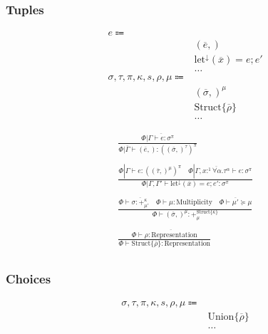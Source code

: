\documentclass {article}
\begin{document}
\subsubsection{Tuples}
\begin{align*}
e \Coloneqq & \\
& (\overline e,) \tag{Tuple Introduction} \\
& \text{let}^\downarrow (\overline x) = e; e' \tag{Tuple Elimination} \\
& \dots \\
\sigma, \tau, \pi, \kappa, s, \rho, \mu \Coloneqq & \\
& (\overline \sigma,)^\mu \tag{Tuple} \\
& \text{Struct} \{ \overline \rho \} \tag{Struct Representation} \\
& \dots
\end{align*}

\begin{gather*}
\frac
{\Phi | \overline { \Gamma \vdash e : \sigma^\pi }}
{\Phi | \overline \Gamma  \vdash (\overline e,) : ((\overline \sigma,)^\tau)^\pi } \\
\\
\frac
{\Phi | \Gamma \vdash e : ((\overline \tau,)^\mu)^\pi \quad \Phi | \Gamma , \overline {x :^1 \forall \alpha. \tau^\alpha} \vdash e : \sigma^\pi}
{\Phi | \Gamma, \Gamma' \vdash \text{let}^\downarrow (\overline x) = e; e' : \sigma^\pi} \\
\\
\frac
{\Phi \vdash \overline {\sigma : +^{\kappa}_{\mu'}} \quad \Phi \vdash \mu : \text{Multiplicity} \quad \Phi \vdash \overline {\mu'} \succeq \mu }
{\Phi \vdash (\overline \sigma,)^\mu : +^{\text{Struct} \{ \overline \kappa\}}_\mu} \\
\\
\frac
{\Phi \vdash \overline {\rho : \text{Representation}}}
{\Phi \vdash \text{Struct} \{ \overline \rho \} : \text{Representation} } \\
\end{gather*}

\subsubsection{Choices}
\begin{align*}
\sigma, \tau, \pi, \kappa, s, \rho, \mu \Coloneqq & \\
& \text{Union} \{ \overline \rho \} \tag{Union Representation} \\
& \dots
\end{align*}
\end{document}
